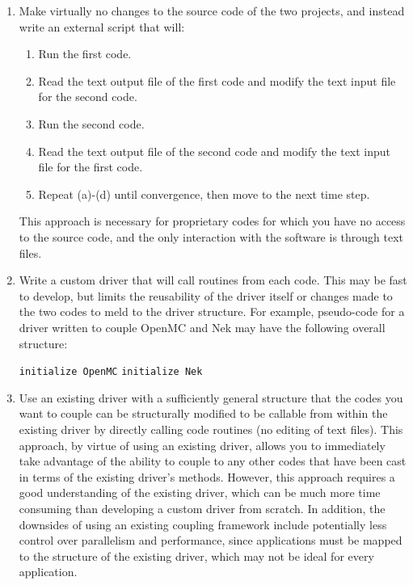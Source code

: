 \documentclass[10pt]{article}
\numberwithin{equation}{section} %
\begin{document}
\begin{enumerate}
\item Make virtually no changes to the source code of the two projects, and instead write an external script that will:
	\begin{enumerate}
	\item Run the first code.
	\item Read the text output file of the first code and modify the text input file for the second code.
	\item Run the second code.
	\item Read the text output file of the second code and modify the text input file for the first code. 
	\item Repeat (a)-(d) until convergence, then move to the next time step.
	\end{enumerate}
	This approach is necessary for proprietary codes for which you have no access to the source code, and the only interaction with the software is through text files.
\item Write a custom driver that will call routines from each code. This may be fast to develop, but limits the reusability of the driver itself or changes made to the two codes to meld to the driver structure. For example, pseudo-code for a driver written to couple OpenMC and Nek may have the following overall structure:

	\begin{algorithm}[H]
	{\tt initialize OpenMC}\;
	{\tt initialize Nek}\;
	\;
	\end{algorithm}
	
\item Use an existing driver with a sufficiently general structure that the codes you want to couple can be structurally modified to be callable from within the existing driver by directly calling code routines (no editing of text files). This approach, by virtue of using an existing driver, allows you to immediately take advantage of the ability to couple to any other codes that have been cast in terms of the existing driver's methods. However, this approach requires a good understanding of the existing driver, which can be much more time consuming than developing a custom driver from scratch. In addition, the downsides of using an existing coupling framework include potentially less control over parallelism and performance, since applications must be mapped to the structure of the existing driver, which may not be ideal for every application.
\end{enumerate}
\end{document}
